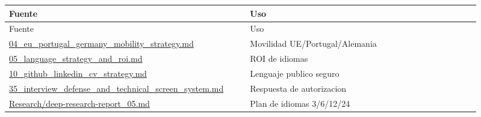 \begin{center}
\scriptsize
\begin{longtable}{>{\raggedright\arraybackslash}p{0.455\linewidth} >{\raggedright\arraybackslash}p{0.455\linewidth}}
\toprule
Fuente & Uso \\
\midrule
\endfirsthead
\toprule
Fuente & Uso \\
\midrule
\endhead
\href{file:///E:/Laboral/04_eu_portugal_germany_mobility_strategy.md}{04\_eu\_portugal\_germany\_mobility\_strategy.md} & Movilidad UE/Portugal/Alemania \\
\href{file:///E:/Laboral/05_language_strategy_and_roi.md}{05\_language\_strategy\_and\_roi.md} & ROI de idiomas \\
\href{file:///E:/Laboral/10_github_linkedin_cv_strategy.md}{10\_github\_linkedin\_cv\_strategy.md} & Lenguaje publico seguro \\
\href{file:///E:/Laboral/35_interview_defense_and_technical_screen_system.md}{35\_interview\_defense\_and\_technical\_screen\_system.md} & Respuesta de autorizacion \\
\href{file:///E:/Laboral/Research/deep-research-report_05.md}{Research/deep-research-report\_05.md} & Plan de idiomas 3/6/12/24 \\
\bottomrule
\end{longtable}
\end{center}
